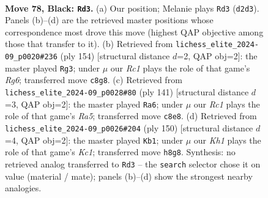 \documentclass[11pt]{article}
\begin{document}
\clearpage

\begin{figure}[p]\centering
\begin{subfigure}{0.46\textwidth}\centering
\resizebox{\linewidth}{!}{%
\newchessgame
\chessboard[
  setfen={2r4k/1R6/8/8/5K2/7P/3r4/8 b - - 0 78},
  showmover=false,
  pgfstyle=straightmove, color=movearrow, markmove={d2-d3}
]}
\caption{}
\end{subfigure}\hfill
\begin{subfigure}{0.46\textwidth}\centering
\resizebox{\linewidth}{!}{%
\newchessgame
\chessboard[
  setfen={8/5r2/6R1/8/R7/8/3k2K1/8 w - - 7 78},
  showmover=false,
  pgfstyle=straightmove, color=movearrow, markmove={g6-g3}
]}
\caption{}
\end{subfigure}
\\[4pt]
\begin{subfigure}{0.46\textwidth}\centering
\resizebox{\linewidth}{!}{%
\newchessgame
\chessboard[
  setfen={8/8/8/7P/r4k2/3K4/8/6R1 b - - 0 71},
  showmover=false,
  pgfstyle=straightmove, color=movearrow, markmove={a4-a6}
]}
\caption{}
\end{subfigure}\hfill
\begin{subfigure}{0.46\textwidth}\centering
\resizebox{\linewidth}{!}{%
\newchessgame
\chessboard[
  setfen={8/2R5/8/8/8/p2k4/7r/2K5 w - - 24 76},
  showmover=false,
  pgfstyle=straightmove, color=movearrow, markmove={c1-b1}
]}
\caption{}
\end{subfigure}
\caption{\textbf{Move 78, Black: \texttt{Rd3}.} (a) Our position; Melanie plays \texttt{Rd3} (\texttt{d2d3}). Panels (b)--(d) are the retrieved master positions whose correspondence most drove this move (highest QAP objective among those that transfer to it). (b) Retrieved from \texttt{lichess\_elite\_2024-09\_p0020\#236} (ply 154) [structural distance $d$=2, QAP obj=2]: the master played \texttt{Rg3}; under $\mu$ our \emph{Rc1} plays the role of that game's \emph{Rg6}; transferred move \texttt{c8g8}. (c) Retrieved from \texttt{lichess\_elite\_2024-09\_p0028\#80} (ply 141) [structural distance $d$=3, QAP obj=2]: the master played \texttt{Ra6}; under $\mu$ our \emph{Rc1} plays the role of that game's \emph{Ra5}; transferred move \texttt{c8e8}. (d) Retrieved from \texttt{lichess\_elite\_2024-09\_p0026\#204} (ply 150) [structural distance $d$=4, QAP obj=2]: the master played \texttt{Kb1}; under $\mu$ our \emph{Kh1} plays the role of that game's \emph{Kc1}; transferred move \texttt{h8g8}. Synthesis: no retrieved analog transferred to \texttt{Rd3} -- the \texttt{search} selector chose it on value (material / mate); panels (b)--(d) show the strongest nearby analogies.}
\label{fig:thought-m155}
\end{figure}
\end{document}
